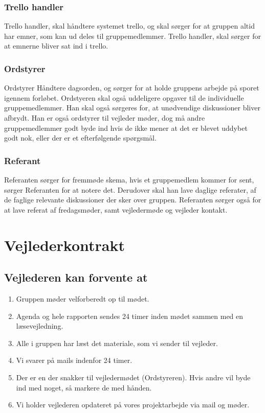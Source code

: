 \subsection{Trello handler}
Trello handler, skal håndtere systemet trello, og skal sørger for at gruppen altid har emner, som kan ud deles til gruppemedlemmer. Trello handler, skal sørger for at emnerne bliver sat ind i trello.

\subsection{Ordstyrer}
Ordstyrer Håndtere dagsorden, og sørger for at holde gruppens arbejde på sporet igennem forløbet. Ordstyeren skal også uddeligere opgaver til de individuelle gruppemedlemmer. Han skal også sørgeres for, at unødvendige diskussioner bliver afbrydt. Han er også ordstyrer til vejleder møder, dog må andre gruppemedlemmer godt byde ind hvis de ikke mener at det er blevet uddybet godt nok, eller der er et efterfølgende spørgsmål.

\subsection{Referant}
Referanten sørger for fremmøde skema, hvis et gruppemedlem kommer for sent, sørger Referanten for at notere det. Derudover skal han lave daglige referater, af de faglige relevante diskussioner der sker over gruppen. Referanten sørger også for at lave referat af fredagsmøder, samt vejledermøde og vejleder kontakt. 

\chapter{Vejlederkontrakt}
\section{Vejlederen kan forvente at}
\begin{enumerate}
\item Gruppen møder velforberedt op til mødet.
\item Agenda og hele rapporten sendes 24 timer inden mødet sammen med en læsevejledning.
\item Alle i gruppen har læst det materiale, som vi sender til vejleder.
\item Vi svarer på mails indenfor 24 timer.
\item Der er en der snakker til vejledermødet (Ordstyreren). Hvis andre vil byde ind med noget, så markere de med hånden.
\item Vi holder vejlederen opdateret på vores projektarbejde via mail og møder.
\end{enumerate}

